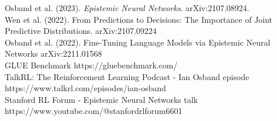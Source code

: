 \documentclass[preview]{standalone}
\begin{document}
Osband et al. (2023). \textit{Epistemic Neural Networks}. arXiv:2107.08924.\\Wen et al. (2022). From Predictions to Decisions: The Importance of Joint Predictive Distributions. arXiv:2107.09224\\Osband et al. (2022). Fine-Tuning Language Models via Epistemic Neural Networks arXiv:2211.01568\\GLUE Benchmark https://gluebenchmark.com/\\TalkRL: The Reinforcement Learning Podcast - Ian Osband episode https://www.talkrl.com/episodes/ian-osband\\Stanford RL Forum - Epistemic Neural Networks talk https://www.youtube.com/@stanfordrlforum6601\\
\end{document}
